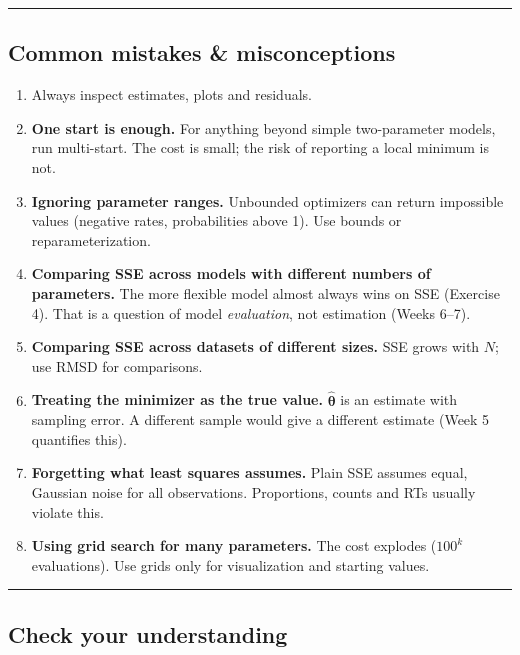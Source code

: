\begin{center}\rule{0.5\linewidth}{0.5pt}\end{center}

\subsection{Common mistakes \& misconceptions}

\begin{enumerate}
\def\labelenumi{\arabic{enumi}.}
\tightlist
\item
  Always inspect estimates, plots and residuals.
\item
  \textbf{One start is enough.} For anything beyond simple two-parameter
  models, run multi-start. The cost is small; the risk of reporting a
  local minimum is not.
\item
  \textbf{Ignoring parameter ranges.} Unbounded optimizers can return
  impossible values (negative rates, probabilities above 1). Use bounds
  or reparameterization.
\item
  \textbf{Comparing SSE across models with different numbers of
  parameters.} The more flexible model almost always wins on SSE
  (Exercise 4). That is a question of model \emph{evaluation}, not
  estimation (Weeks 6--7).
\item
  \textbf{Comparing SSE across datasets of different sizes.} SSE grows
  with \(N\); use RMSD for comparisons.
\item
  \textbf{Treating the minimizer as the true value.}
  \(\hat{\boldsymbol\theta}\) is an estimate with sampling error. A
  different sample would give a different estimate (Week 5 quantifies
  this).
\item
  \textbf{Forgetting what least squares assumes.} Plain SSE assumes
  equal, Gaussian noise for all observations. Proportions, counts and
  RTs usually violate this.
\item
  \textbf{Using grid search for many parameters.} The cost explodes
  (\(100^k\) evaluations). Use grids only for visualization and starting
  values.
\end{enumerate}

\begin{center}\rule{0.5\linewidth}{0.5pt}\end{center}

\subsection{Check your understanding}

